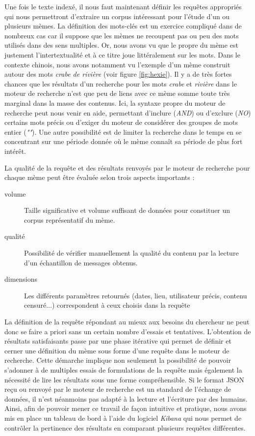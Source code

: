     Une fois le texte indexé, il nous faut maintenant définir les requêtes appropriés qui nous permettront d'extraire un corpus intéressant pour l'étude d'un ou plusieurs mèmes. La définition des mots-clés est un exercice compliqué dans de nombreux cas car il suppose que les mèmes ne recoupent pas ou peu des mots utilisés dans des sens multiples. Or, nous avons vu que le propre du mème est justement l'intertextualité et à ce titre joue littéralement sur les mots. Dans le contexte chinois, nous avons notamment vu l'exemple d'un mème construit autour des mots \textit{crabe de rivière} (voir figure \ref{fig:hexie}). Il y a de très fortes chances que les résultats d'un recherche pour les mots \textit{crabe} et \textit{rivière} dans le moteur de recherche n'est que peu de liens avec ce mème somme toute très marginal dans la masse des contenus. Ici, la syntaxe propre du moteur de recherche peut nous venir en aide, permettant d'inclure (\textit{AND}) ou d'exclure (\textit{NO}) certains mots précis ou d'exiger du moteur de considérer des groupes de mots entier (\textit{""}). Une autre possibilité est de limiter la recherche dans le temps en se concentrant sur une période donnée où le  mème connaît sa période de plus fort intérêt.

    La qualité de la requête et des résultats renvoyés par le moteur de recherche pour chaque mème peut être évaluée selon trois aspects importants :

    \begin{description}
        \item[volume]
            Taille significative et volume suffisant de données pour constituer un corpus représentatif du mème.
        \item[qualité]
            Possibilité de vérifier manuellement la qualité du contenu par la lecture d{\textquoteright}un échantillon de  messages obtenus.
        \item[dimensions]
            Les différents paramètres retournés (dates, lieu, utilisateur précis, contenu censuré...) correspondent à ceux choisis dans la requête
    \end{description}

    La définition de la requête répondant au mieux aux besoins du chercheur  ne peut donc se faire a priori sans un certain nombre d'essais et tentatives. L'obtention de résultats satisfaisants passe par une phase itérative qui permet de définir et cerner une définition du mème sous forme d'une requête dans le moteur de recherche. Cette démarche implique non seulement la possibilité de pouvoir s'adonner à de multiples essais de formulations de la requête mais également la nécessité de lire les résultats sous une forme compréhensible. Si le format JSON reçu ou renvoyé par le moteur de recherche est un standard de l'échange de données, il n'est néanmoins pas adapté à la lecture et l'écriture par des humains. Ainsi, afin de pouvoir mener ce travail de façon intuitive et pratique, nous avons mis en place un tableau de bord à l'aide du logiciel \textit{Kibana} qui nous permet de contr\^oler la pertinence des résultats en comparant plusieurs requêtes différentes.

